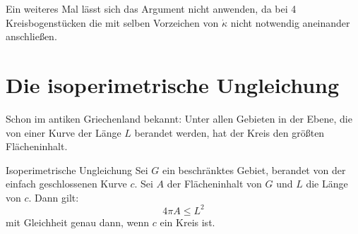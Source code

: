 \documentclass{mycourse}
\begin{document}
\begin{note*}
Ein weiteres Mal lässt sich das Argument nicht anwenden, da bei 4 Kreisbogenstücken die mit selben Vorzeichen von $\dot \kappa$ nicht notwendig aneinander anschließen.
\end{note*}

\section{Die isoperimetrische Ungleichung}
Schon im antiken Griechenland bekannt: Unter allen Gebieten in der Ebene, die von einer Kurve der Länge $L$ berandet werden, hat der Kreis den größten Flächeninhalt.

\begin{st}{Isoperimetrische Ungleichung}
\label{6.1}
Sei $G$ ein beschränktes Gebiet, berandet von der einfach geschlossenen Kurve $c$. Sei $A$ der Flächeninhalt von $G$ und $L$ die Länge von $c$. Dann gilt: \[ 4 \pi A \leq L^2 \]
mit Gleichheit genau dann, wenn $c$ ein Kreis ist.
\end{st}
\end{document}

